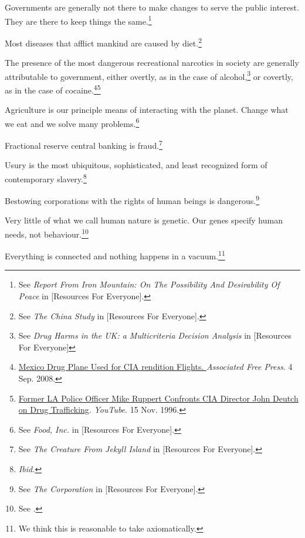 \item
Governments are generally not there to make changes to serve the public interest. They are there to keep things the same.\footnote{See {\it Report From Iron Mountain: On The Possibility And Desirability Of Peace} in [Resources For Everyone].}

\item
Most diseases that afflict mankind are caused by diet.\footnote{See {\it The China Study} in [Resources For Everyone].}

\item
The presence of the most dangerous recreational narcotics in society are generally attributable to government, either overtly, as in the case of alcohol,\footnote{See {\it Drug Harms in the UK: a Multicriteria Decision Analysis} in [Resources For Everyone]} or covertly, as in the case of cocaine.\footnote{\href{http://afp.google.com/article/ALeqM5j6QonBKKMo2gw1e3ql-xUcQEZbVg}{Mexico Drug Plane Used for CIA rendition Flights. }{\it Associated Free Press}. 4 Sep. 2008.}\footnote{\href{http://www.youtube.com/watch?v=UT5MY3C86bk}{Former LA Police Officer Mike Ruppert Confronts CIA Director John Deutch on Drug Trafficking}. {\it YouTube}. 15 Nov. 1996.}

\item
Agriculture is our principle means of interacting with the planet. Change what we eat and we solve many problems.\footnote{See {\it Food, Inc.} in [Resources For Everyone].}

\item
Fractional reserve central banking is fraud.\footnote{See {\it The Creature From Jekyll Island} in [Resources For Everyone].}

\item
Usury is the most ubiquitous, sophisticated, and least recognized form of contemporary slavery.\footnote{{\it Ibid.}}

\item
Bestowing corporations with the rights of human beings is dangerous.\footnote{See {\it The Corporation} in [Resources For Everyone].}

\item
Very little of what we call human nature is genetic. Our genes specify human needs, not behaviour.\footnote{See .}

\item
Everything is connected and nothing happens in a vacuum.\footnote{We think this is reasonable to take axiomatically.}
\stopitemize

